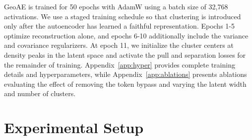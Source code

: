 \documentclass[11pt]{article}
\begin{document}
GeoAE is trained for 50 epochs with AdamW \citep{loshchilov2019adamw} using a batch size of 32{,}768 activations. We use a staged training schedule so that clustering is introduced only after the autoencoder has learned a faithful representation. Epochs 1-5 optimize reconstruction alone, and epochs 6-10 additionally include the variance and covariance regularizers. At epoch 11, we initialize the cluster centers at density peaks in the latent space \citep{rodriguez2014peaks} and activate the pull and separation losses for the remainder of training. Appendix~\ref{app:hyper} provides complete training details and hyperparameters, while Appendix~\ref{app:ablations} presents ablations evaluating the effect of removing the token bypass and varying the latent width and number of clusters.







\section{Experimental Setup}
\label{sec:setup}
\end{document}
